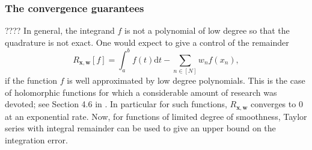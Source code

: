 \documentclass[twoside,11pt]{book}
\numberwithin{theorem}{chapter}
\numberwithin{definition}{chapter}
\numberwithin{proposition}{chapter}
\numberwithin{corollary}{chapter}
\numberwithin{example}{chapter}
\numberwithin{lemma}{chapter}
\begin{document}



\subsubsection{The convergence guarantees}

????
In general, the integrand $f$ is not a polynomial of low degree so that the quadrature is not exact. One would expect to give a control of the remainder 
\begin{equation}
R_{\bm{x},\bm{w}} [f] = \int_{a}^{b}f(t)\mathrm{d}t - \sum\limits_{n \in [N]} w_{n}f(x_{n}),
\end{equation}
if the function $f$ is well approximated by low degree polynomials. This is the case of holomorphic functions for which a considerable amount of research was devoted; see Section 4.6 in \citep{DavRab84}. In particular for such functions, $R_{\bm{x},\bm{w}}$ converges to $0$ at an exponential rate. Now, for functions of limited degree of smoothness, Taylor series with integral remainder can be used to give an upper bound on the integration error. 
\end{document}
